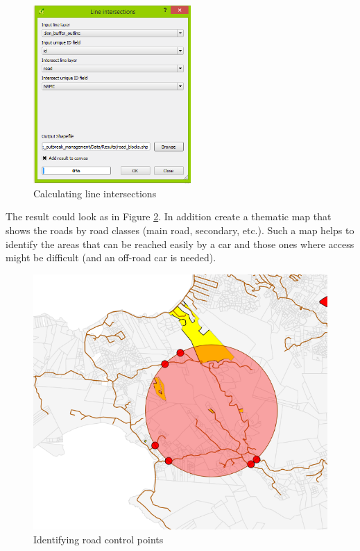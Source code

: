 \documentclass[a4paper,12pt,titlepage]{article}
\begin{document}
\begin{figure}[H]
	\centering
	\includegraphics[width=6cm]{Images/line_intersection.png}
	\caption{Calculating line intersections}\label{fig:line_intersection}
\end{figure}

The result could look as in Figure \ref{fig:control_points}. In addition create a thematic map that shows the roads by road classes (main road, secondary, etc.). Such a map helps to identify the areas that can be reached easily by a car and those ones where access might be difficult (and an off-road car is needed).

\begin{figure}[htb]
\centering
\includegraphics[width=12cm]{Images/control_points.png}
\caption{Identifying road control points}\label{fig:control_points}
\end{figure}
\end{document}
